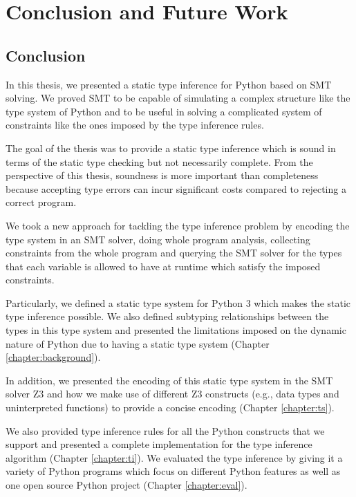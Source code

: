 
\chapter{Conclusion and Future Work}\label{chapter:conc}

\section{Conclusion}
In this thesis, we presented a static type inference for Python based on SMT solving. We proved SMT to be capable of simulating a complex structure like the type system of Python and to be useful in solving a complicated system of constraints like the ones imposed by the type inference rules.

The goal of the thesis was to provide a static type inference which is sound in terms of the static type checking but not necessarily complete. From the perspective of this thesis, soundness is more important than completeness because accepting type errors can incur significant costs compared to rejecting a correct program.

We took a new approach for tackling the type inference problem by encoding the type system in an SMT solver, doing whole program analysis, collecting constraints from the whole program and querying the SMT solver for the types that each variable is allowed to have at runtime which satisfy the imposed constraints.

Particularly, we defined a static type system for Python 3 which makes the static type inference possible. We also defined subtyping relationships between the types in this type system and presented the limitations imposed on the dynamic nature of Python due to having a static type system (Chapter \ref{chapter:background}).

In addition, we presented the encoding of this static type system in the SMT solver Z3 and how we make use of different Z3 constructs (e.g., data types and uninterpreted functions) to provide a concise encoding (Chapter \ref{chapter:ts}).

We also provided type inference rules for all the Python constructs that we support and presented a complete implementation for the type inference algorithm (Chapter \ref{chapter:ti}). We evaluated the type inference by giving it a variety of Python programs which focus on different Python features as well as one open source Python project (Chapter \ref{chapter:eval}).

